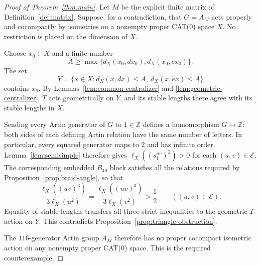 \begin{proof}[Proof of Theorem~\ref{thm:main}]
Let $M$ be the explicit finite matrix of Definition~\ref{def:matrix}.
Suppose, for a contradiction, that $G=A_M$ acts properly and
cocompactly by isometries on a nonempty proper CAT(0) space $X$.
No restriction is placed on the dimension of $X$.

Choose $x_0\in X$ and a finite number
\[
 A\ge\max\{d_X(x_0,dx_0),d_X(x_0,ex_0)\}.
\]
The set
\[
 Y=\{x\in X:d_X(x,dx)\le A,\ d_X(x,ex)\le A\}
\]
contains $x_0$.  By Lemmas~\ref{lem:common-centralizer} and
\ref{lem:geometric-centralizer}, $T$ acts geometrically on $Y$,
and its stable lengths there agree with its stable lengths in $X$.

Sending every Artin generator of $G$ to $1\in\mathbb Z$ defines
a homomorphism $G\to\mathbb Z$: both sides of each defining
Artin relation have the same number of letters.  In particular,
every squared generator maps to $2$ and has infinite order.
Lemma~\ref{lem:semisimple} therefore gives
$\ell_X((s_1^{uv})^2)>0$ for each $(u,v)\in\mathcal E$.
The corresponding embedded $B_{40}$ block satisfies all the
relations required by Proposition~\ref{prop:braid-angle}, so that
\[
 \frac{\ell_X((uv)^3)}{3\ell_X(u^2)}
 =\frac{\ell_X((uv)^3)}{3\ell_X(v^2)}
 >\frac12
 \qquad ((u,v)\in\mathcal E).
\]
Equality of stable lengths transfers all three strict inequalities
to the geometric $T$-action on $Y$.  This contradicts
Proposition~\ref{prop:triangle-obstruction}.

The $116$-generator Artin group $A_M$ therefore has no proper
cocompact isometric action on any nonempty proper CAT(0) space.
This is the required counterexample.
\end{proof}
